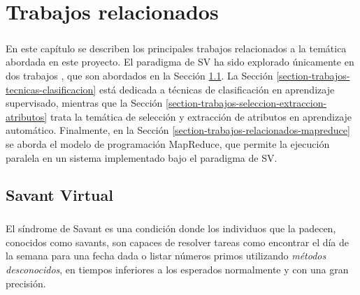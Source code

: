 \chapter{Trabajos relacionados} \label{section-trabajo-relacionado}

\paragraph{}En este capítulo se describen los principales trabajos relacionados a la temática abordada en este proyecto. El paradigma de SV ha sido explorado únicamente en dos trabajos \cite{savant-original} \cite{savant-bag}, que son abordados en la Sección \ref{section-trabajos-relacionados-savant}. La Sección \ref{section-trabajos-tecnicas-clasificacion} está dedicada a técnicas de clasificación en aprendizaje supervisado, mientras que la Sección \ref{section-trabajos-seleccion-extraccion-atributos} trata la temática de selección y extracción de atributos en aprendizaje automático. Finalmente, en la Sección \ref{section-trabajos-relacionados-mapreduce} se aborda el modelo de programación MapReduce, que permite la ejecución paralela en un sistema implementado bajo el paradigma de SV.


\section{Savant Virtual} \label{section-trabajos-relacionados-savant}

\paragraph{} El síndrome de Savant es una condición donde los individuos que la padecen, conocidos como savants, son capaces de resolver tareas como encontrar el día de la semana para una fecha dada o listar números primos utilizando \textit{métodos desconocidos}, en tiempos inferiores a los esperados normalmente y con una gran precisión. 

